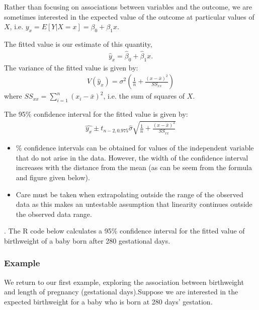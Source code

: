 \documentclass[letterpaper,10pt,english]{jupyterBook}
\begin{document}
\sphinxAtStartPar
Rather than focusing on associations between variables and the outcome, we are sometimes interested in the expected value of the outcome at particular values of \(X\), i.e. \(y_x = E[Y | X=x] = \beta_0+\beta_1 x\).

\sphinxAtStartPar
The fitted value is our estimate of this quantity,
\begin{equation*}
\begin{split}
\hat{y}_x = \hat{\beta}_0 + \hat{\beta}_1 x.
\end{split}
\end{equation*}
\sphinxAtStartPar
The variance of the fitted value is given by:
\begin{equation*}
\begin{split}
V(\hat{y}_x) = \sigma^2 \left(\frac{1}{n}+\frac{(x-\bar{x})^2}{SS_{xx}}\right)
\end{split}
\end{equation*}
\sphinxAtStartPar
where \(SS_{xx}=\sum_{i=1}^n(x_i-\bar{x})^2\), i.e. the sum of squares of \(X\).

\sphinxAtStartPar
The 95\% confidence interval for the fitted value is given by:
\begin{equation*}
\begin{split}
\hat{y_x} \pm t_{n-2, 0.975}\hat{\sigma} \sqrt{\frac{1}{n}+ \frac{(x-\bar{x})^2}{SS_{xx}}}
\end{split}
\end{equation*}\begin{itemize}
\item {} 
\% confidence intervals can be obtained for values of the independent variable that do not arise in the data. However, the width of the confidence interval increases with the distance from the mean (as can be seem from the formula and figure given below).

\item {} 
\sphinxAtStartPar
Care must be taken when extrapolating outside the range of the observed data as this makes an un\sphinxhyphen{}testable assumption that linearity continues outside the observed data range.

\end{itemize}

\sphinxAtStartPar
{}. The R code below calculates a 95\% confidence interval for the fitted value of birthweight of a baby born after 280 gestational days.


\subsubsection{Example}
\label{\detokenize{12.i. Linear Regression I:example}}
\sphinxAtStartPar
We return to our first example, exploring the association between birthweight and length of pregnancy (gestational days).Suppose we are interested in the expected birthweight for a baby who is born at 280 days’ gestation.
\end{document}

